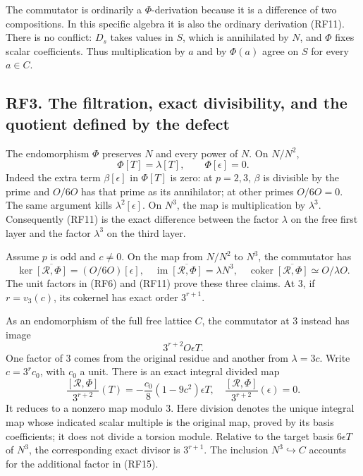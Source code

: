 \documentclass[
]{article}
\begin{document}
The commutator is ordinarily a \(\Phi\)-derivation because it is a
difference of two compositions. In this specific algebra it is also the
ordinary derivation (RF11). There is no conflict: \(D_s\) takes values
in \(S\), which is annihilated by \(N\), and \(\Phi\) fixes scalar
coefficients. Thus multiplication by \(a\) and by \(\Phi(a)\) agree on
\(S\) for every \(a\in C\).

\subsection{RF3. The filtration, exact divisibility, and the quotient
defined by the
defect}\label{rf3.-the-filtration-exact-divisibility-and-the-quotient-defined-by-the-defect}

The endomorphism \(\Phi\) preserves \(N\) and every power of \(N\). On
\(N/N^2\), \[
\Phi[T]=\lambda[T],\qquad \Phi[\epsilon]=0.
\tag{RF13}
\] Indeed the extra term \(\beta[\epsilon]\) in \(\Phi[T]\) is zero: at
\(p=2,3\), \(\beta\) is divisible by the prime and \(O/6O\) has that
prime as its annihilator; at other primes \(O/6O=0\). The same argument
kills \(\lambda^2[\epsilon]\). On \(N^3\), the map is multiplication by
\(\lambda^3\). Consequently (RF11) is the exact difference between the
factor \(\lambda\) on the free first layer and the factor \(\lambda^3\)
on the third layer.

Assume \(p\) is odd and \(c\ne0\). On the map from \(N/N^2\) to \(N^3\),
the commutator has \[
\ker\overline{[\mathcal R,\Phi]}=(O/6O)[\epsilon],\quad
\operatorname{im}\overline{[\mathcal R,\Phi]}=\lambda N^3,\quad
\operatorname{coker}\overline{[\mathcal R,\Phi]}\simeq O/\lambda O.
\tag{RF14}
\] The unit factors in (RF6) and (RF11) prove these three claims. At 3,
if \(r=v_3(c)\), its cokernel has exact order \(3^{r+1}\).

As an endomorphism of the full free lattice \(C\), the commutator at 3
instead has image \[
3^{r+2}O\epsilon T.
\tag{RF15}
\] One factor of 3 comes from the original residue and another from
\(\lambda=3c\). Write \(c=3^rc_0\), with \(c_0\) a unit. There is an
exact integral divided map \[
\frac{[\mathcal R,\Phi]}{3^{r+2}}(T)
=-\frac{c_0}{8}(1-9c^2)\epsilon T,
\quad
\frac{[\mathcal R,\Phi]}{3^{r+2}}(\epsilon)=0.
\tag{RF16}
\] It reduces to a nonzero map modulo 3. Here division denotes the
unique integral map whose indicated scalar multiple is the original map,
proved by its basis coefficients; it does not divide a torsion module.
Relative to the target basis \(6\epsilon T\) of \(N^3\), the
corresponding exact divisor is \(3^{r+1}\). The inclusion
\(N^3\hookrightarrow C\) accounts for the additional factor in (RF15).
\end{document}
